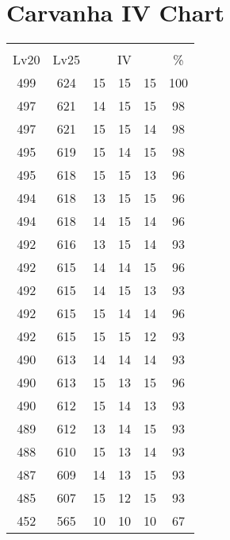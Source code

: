 \documentclass{article}%
\begin{document}
%
\normalsize%
\section{Carvanha IV Chart}%
\label{sec:Carvanha IV Chart}%
\renewcommand{\arraystretch}{1.5}%
\begin{tabular}{|c|c|c|c|c|c|}%
\hline%
\multicolumn{6}{|c|}{\textcolor{white}{ 
\linebreak{Carvanha}
}%
\cellcolor{black}}\\%
\multicolumn{1}{|c}{Lv20}&\multicolumn{1}{c|}{Lv25}&\multicolumn{3}{c|}{IV}&\multicolumn{1}{|c|}{\%}\\%
\hline%
\rowcolor{color100}%
499&624&15&15&15&100\\%
\hline%
\rowcolor{color98}%
497&621&14&15&15&98\\%
\hline%
\rowcolor{color98}%
497&621&15&15&14&98\\%
\hline%
\rowcolor{color98}%
495&619&15&14&15&98\\%
\hline%
\rowcolor{color96}%
495&618&15&15&13&96\\%
\hline%
\rowcolor{color96}%
494&618&13&15&15&96\\%
\hline%
\rowcolor{color96}%
494&618&14&15&14&96\\%
\hline%
\rowcolor{color93}%
492&616&13&15&14&93\\%
\hline%
\rowcolor{color96}%
492&615&14&14&15&96\\%
\hline%
\rowcolor{color93}%
492&615&14&15&13&93\\%
\hline%
\rowcolor{color96}%
492&615&15&14&14&96\\%
\hline%
\rowcolor{color93}%
492&615&15&15&12&93\\%
\hline%
\rowcolor{color93}%
490&613&14&14&14&93\\%
\hline%
\rowcolor{color96}%
490&613&15&13&15&96\\%
\hline%
\rowcolor{color93}%
490&612&15&14&13&93\\%
\hline%
\rowcolor{color93}%
489&612&13&14&15&93\\%
\hline%
\rowcolor{color93}%
488&610&15&13&14&93\\%
\hline%
\rowcolor{color93}%
487&609&14&13&15&93\\%
\hline%
\rowcolor{color93}%
485&607&15&12&15&93\\%
\hline%
\rowcolor{color91}%
452&565&10&10&10&67\\%
\end{tabular}

%
\end{document}

